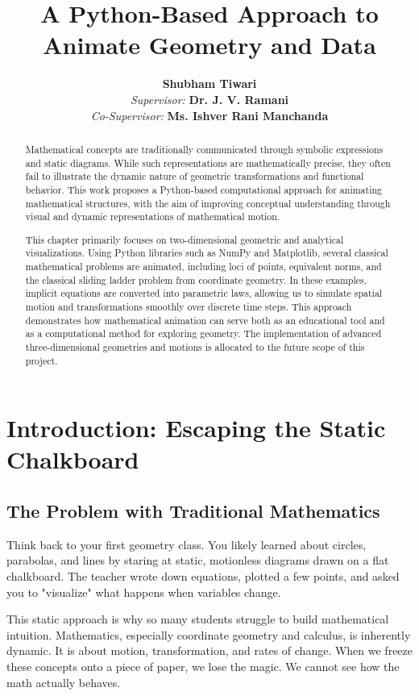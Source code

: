 \documentclass[12pt, a4paper]{report}
\title{\Huge \textbf{A Python-Based Approach to Animate Geometry and Data}}
\author{
    \Large \textbf{Shubham Tiwari} \\[1ex]
    \normalsize \textit{Supervisor:} \textbf{Dr. J. V. Ramani} \\
    \normalsize \textit{Co-Supervisor:} \textbf{Ms. Ishver Rani Manchanda}
}
\date{}
\begin{document}
\maketitle

\begin{abstract}
Mathematical concepts are traditionally communicated through symbolic expressions and static diagrams. While such representations are mathematically precise, they often fail to illustrate the dynamic nature of geometric transformations and functional behavior. This work proposes a Python-based computational approach for animating mathematical structures, with the aim of improving conceptual understanding through visual and dynamic representations of mathematical motion. 

This chapter primarily focuses on two-dimensional geometric and analytical visualizations. Using Python libraries such as NumPy and Matplotlib, several classical mathematical problems are animated, including loci of points, equivalent norms, and the classical sliding ladder problem from coordinate geometry. In these examples, implicit equations are converted into parametric laws, allowing us to simulate spatial motion and transformations smoothly over discrete time steps. This approach demonstrates how mathematical animation can serve both as an educational tool and as a computational method for exploring geometry. The implementation of advanced three-dimensional geometries and motions is allocated to the future scope of this project.
\end{abstract}

\tableofcontents
\newpage

\chapter{Introduction: Escaping the Static Chalkboard}

\section{The Problem with Traditional Mathematics}

Think back to your first geometry class. You likely learned about circles, parabolas, and lines by staring at static, motionless diagrams drawn on a flat chalkboard. The teacher wrote down equations, plotted a few points, and asked you to "visualize" what happens when variables change. 

This static approach is why so many students struggle to build mathematical intuition. Mathematics, especially coordinate geometry and calculus, is inherently dynamic. It is about motion, transformation, and rates of change. When we freeze these concepts onto a piece of paper, we lose the magic. We cannot see how the math actually behaves. 
\end{document}
